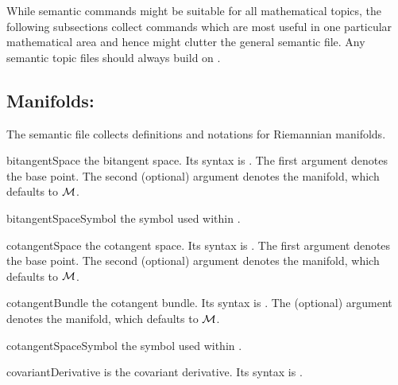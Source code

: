 \documentclass[english,a4paper,DIV=12,parskip=full,oneside]{scrartcl}
\begin{document}
While semantic commands might be suitable for all mathematical topics, the following subsections collect commands which are most useful in one particular mathematical area and hence might clutter the general semantic file.
Any semantic topic files should always build on .


\subsection{Manifolds: \texorpdfstring{}{numapde-manifolds.sty}}\label{subsec:manifolds}

The semantic file  collects definitions and notations for Riemannian manifolds.
\begin{commandlist}
	\item[bitangentSpace] the bitangent space.
		Its syntax is .
		The first argument denotes the base point.
		The second (optional) argument denotes the manifold, which defaults to $\mathcal{M}$.
		\par{}
		\par{}
	\item[bitangentSpaceSymbol] the symbol used within \codeCommand{\bitangentSpace}.
		\par\mathCodeExample{\bitangentSpaceSymbol}
	\item[cotangentSpace] the cotangent space.
		Its syntax is .
		The first argument denotes the base point.
		The second (optional) argument denotes the manifold, which defaults to $\mathcal{M}$.
		\par{}
		\par{}
	\item[cotangentBundle] the cotangent bundle.
		Its syntax is \codeCommand{\cotangentBundle[#1]}.
		The (optional) argument denotes the manifold, which defaults to $\mathcal{M}$.
		\par\mathCodeExample{\cotangentBundle}
		\par\mathCodeExample{\cotangentBundle[\cN]}
	\item[cotangentSpaceSymbol] the symbol used within \codeCommand{\cotangent}.
		\par\mathCodeExample{\cotangentSpaceSymbol}
	\item[covariantDerivative] is the covariant derivative.
		Its syntax is .

\end{commandlist}
\end{document}

